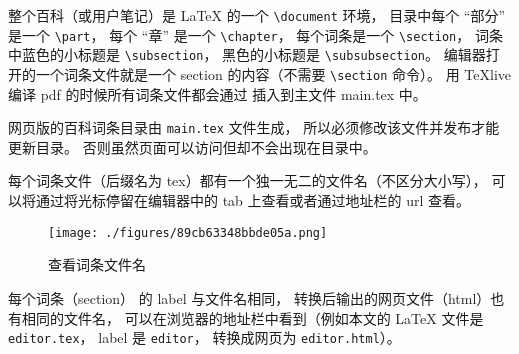 整个百科（或用户笔记）是 LaTeX 的一个 \verb|\document| 环境， 目录中每个 “部分” 是一个 \verb|\part|， 每个 “章” 是一个 \verb|\chapter|， 每个词条是一个 \verb|\section|， 词条中蓝色的小标题是 \verb|\subsection|， 黑色的小标题是 \verb|\subsubsection|。 编辑器打开的一个词条文件就是一个 section 的内容（不需要 \verb|\section| 命令）。 用 TeXlive 编译 pdf 的时候所有词条文件都会通过 \verb|| 插入到主文件 main.tex 中。

网页版的百科词条目录由 \verb|main.tex| 文件生成， 所以必须修改该文件并发布才能更新目录。 否则虽然页面可以访问但却不会出现在目录中。

每个词条文件（后缀名为 tex）都有一个独一无二的文件名（不区分大小写）， 可以将通过将光标停留在编辑器中的 tab 上查看或者通过地址栏的 url 查看。

\begin{figure}[ht]
\centering
\texttt{[image: ./figures/89cb63348bbde05a.png]}
\caption{查看词条文件名} \label{fig_editor_2}
\end{figure}

每个词条（section） 的 label 与文件名相同， 转换后输出的网页文件（html）也有相同的文件名， 可以在浏览器的地址栏中看到（例如本文的 LaTeX 文件是 \verb|editor.tex|， label 是 \verb|editor|， 转换成网页为 \verb|editor.html|）。

